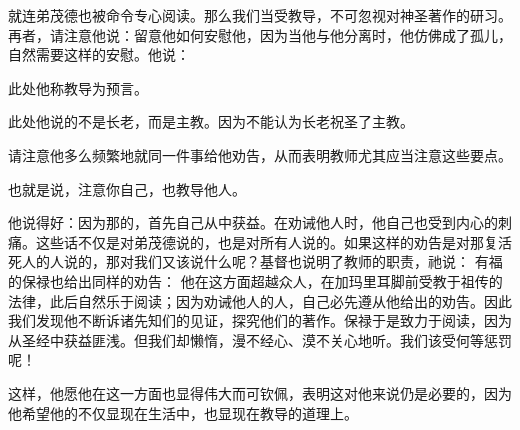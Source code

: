 \par

就连弟茂德也被命令专心阅读。那么我们当受教导，不可忽视对神圣著作的研习。再者，请注意他说：留意他如何安慰他，因为当他与他分离时，他仿佛成了孤儿，自然需要这样的安慰。他说：\par

\par

此处他称教导为预言。\par

此处他说的不是长老，而是主教。因为不能认为长老祝圣了主教。\par

 \par

请注意他多么频繁地就同一件事给他劝告，从而表明教师尤其应当注意这些要点。\par

 也就是说，注意你自己，也教导他人。\par

\par

他说得好：因为那的，首先自己从中获益。在劝诫他人时，他自己也受到内心的刺痛。这些话不仅是对弟茂德说的，也是对所有人说的。如果这样的劝告是对那复活死人的人说的，那对我们又该说什么呢？基督也说明了教师的职责，祂说： 有福的保禄也给出同样的劝告： 他在这方面超越众人，在加玛里耳脚前受教于祖传的法律，此后自然乐于阅读；因为劝诫他人的人，自己必先遵从他给出的劝告。因此我们发现他不断诉诸先知们的见证，探究他们的著作。保禄于是致力于阅读，因为从圣经中获益匪浅。但我们却懒惰，漫不经心、漠不关心地听。我们该受何等惩罚呢！\par

\par

这样，他愿他在这一方面也显得伟大而可钦佩，表明这对他来说仍是必要的，因为他希望他的不仅显现在生活中，也显现在教导的道理上。\par

